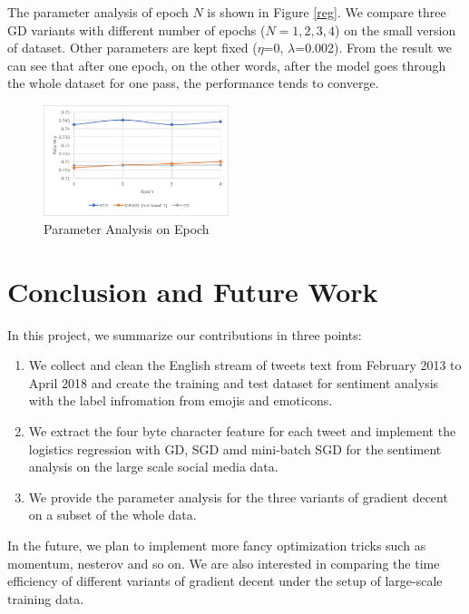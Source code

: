 \documentclass[sigconf]{acmart}
\begin{document}
The parameter analysis of epoch $N$ is shown in Figure \ref{reg}. We compare three GD variants with different number of epochs ($N = 1, 2, 3, 4$) on the small version of dataset. Other parameters are kept fixed ($\eta$=0, $\lambda$=0.002). From the result we can see that after one epoch, on the other words, after the model goes through the whole dataset for one pass, the performance tends to converge.

\begin{figure}[ht]
\centering
\includegraphics[width=0.48\textwidth]{epoch.png}
\caption{Parameter Analysis on Epoch}
\label{epoch}
\end{figure}

\section{Conclusion and Future Work}
\label{sec:conclusionAndFutureWork}

In this project, we summarize our contributions in three points:

\begin{enumerate}  
\item We collect and clean the English stream of tweets text from February 2013 to April 2018 and create the training and test dataset for sentiment analysis with the label infromation from emojis and emoticons.
\item We extract the four byte character feature for each tweet and implement the logistics regression with GD, SGD amd mini-batch SGD for the sentiment analysis on the large scale social media data.
\item We provide the parameter analysis for the three variants of gradient decent on a subset of the whole data.
\end{enumerate}

In the future, we plan to implement more fancy optimization tricks such as momentum, nesterov and so on. We are also interested in comparing the time efficiency of different variants of gradient decent under the setup of large-scale training data.


\normalsize

{\vskip 12pt}
\noindent




\end{document}
